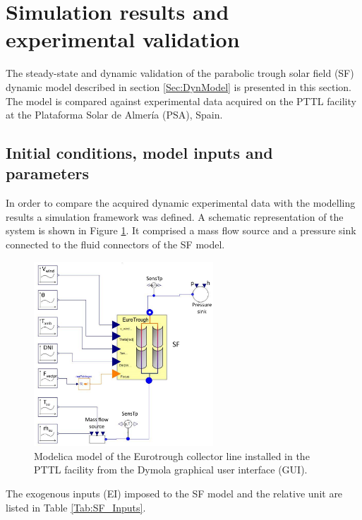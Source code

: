 \documentclass[final,3p,times,review]{elsarticle}
\begin{document}
\section{Simulation results and experimental validation}
%
The steady-state and dynamic validation of the parabolic trough solar field (SF) dynamic model described in section \ref{Sec:DynModel} is presented in this section. The model is compared against experimental data acquired on the PTTL facility at the Plataforma Solar de Almer\' ia (PSA), Spain. 
%
\subsection{Initial conditions, model inputs and parameters}
%
\label{subsec:SF_model}
In order to compare the acquired dynamic experimental data with the modelling results a simulation framework was defined. A schematic representation of the system is shown in Figure \ref{fig:SF_ModModel}. It comprised a mass flow source and a pressure sink connected to the fluid connectors of the SF model. 
%
\begin{figure}[h!]
\centering
\includegraphics[width=0.6\textwidth]{Figures/Modelica_SF_v1crop.pdf}
\caption{Modelica model of the Eurotrough collector line installed in the PTTL facility from the Dymola graphical user interface (GUI).}
\label{fig:SF_ModModel}
\end{figure}
%
The exogenous inputs (EI) imposed to the SF model and the relative unit are listed in Table \ref{Tab:SF_Inputs}. 
%
\end{document}
